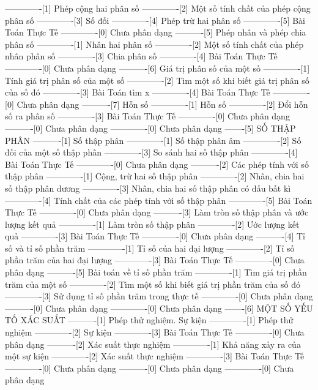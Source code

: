 -------------[1] Phép cộng hai phân số
-------------[2] Một số tính chất của phép cộng phân số
-------------[3] Số đối
-------------[4] Phép trừ hai phân số
-------------[5] Bài Toán Thực Tế
-------------[0] Chưa phân dạng
----------[5] Phép nhân và phép chia phân số
-------------[1] Nhân hai phân số
-------------[2] Một số tính chất của phép nhân phân số
-------------[3] Chia phân số
-------------[4] Bài Toán Thực Tế
-------------[0] Chưa phân dạng
----------[6] Giá trị phân số của một số
-------------[1] Tính giá trị phân số của một số
-------------[2] Tìm một số khi biết giá trị phân số của số đó
-------------[3] Bài Toán tìm x
-------------[4] Bài Toán Thực Tế
-------------[0] Chưa phân dạng
----------[7] Hỗn số
-------------[1] Hỗn số
-------------[2] Đổi hỗn số ra phân số
-------------[3] Bài Toán Thực Tế
-------------[0] Chưa phân dạng
----------[0] Chưa phân dạng
-------------[0] Chưa phân dạng
-------[5] SỐ THẬP PHÂN
----------[1] Số thập phân
-------------[1] Số thập phân âm
-------------[2] Số đối của một số thập phân
-------------[3] So sánh hai số thập phân
-------------[4] Bài Toán Thực Tế
-------------[0] Chưa phân dạng
----------[2] Các phép tính với số thập phân
-------------[1] Cộng, trừ hai số thập phân
-------------[2] Nhân, chia hai số thập phân dương
-------------[3] Nhân, chia hai số thập phân có dấu bất kì
-------------[4] Tính chất của các phép tính với số thập phân
-------------[5] Bài Toán Thực Tế
-------------[0] Chưa phân dạng
----------[3] Làm tròn số thập phân và ước lượng kết quả
-------------[1] Làm tròn số thập phân
-------------[2] Ước lượng kết quả
-------------[3] Bài Toán Thực Tế
-------------[0] Chưa phân dạng
----------[4] Tỉ số và tỉ số phần trăm
-------------[1] Tỉ số của hai đại lượng
-------------[2] Tỉ số phần trăm của hai đại lượng
-------------[3] Bài Toán Thực Tế
-------------[0] Chưa phân dạng
----------[5] Bài toán về tỉ số phần trăm
-------------[1] Tìm giá trị phần trăm của một số
-------------[2] Tìm một số khi biết giá trị phần trăm của số đó
-------------[3] Sử dụng tỉ số phần trăm trong thực tế
-------------[0] Chưa phân dạng
----------[0] Chưa phân dạng
-------------[0] Chưa phân dạng
-------[6] MỘT SỐ YẾU TỐ XÁC SUẤT
----------[1] Phép thử nghiệm. Sự kiện
-------------[1] Phép thử nghiệm
-------------[2] Sự kiện
-------------[3] Bài Toán Thực Tế
-------------[0] Chưa phân dạng
----------[2] Xác suất thực nghiệm
-------------[1] Khả năng xảy ra của một sự kiện
-------------[2] Xác suất thực nghiệm
-------------[3] Bài Toán Thực Tế
-------------[0] Chưa phân dạng
----------[0] Chưa phân dạng
-------------[0] Chưa phân dạng
